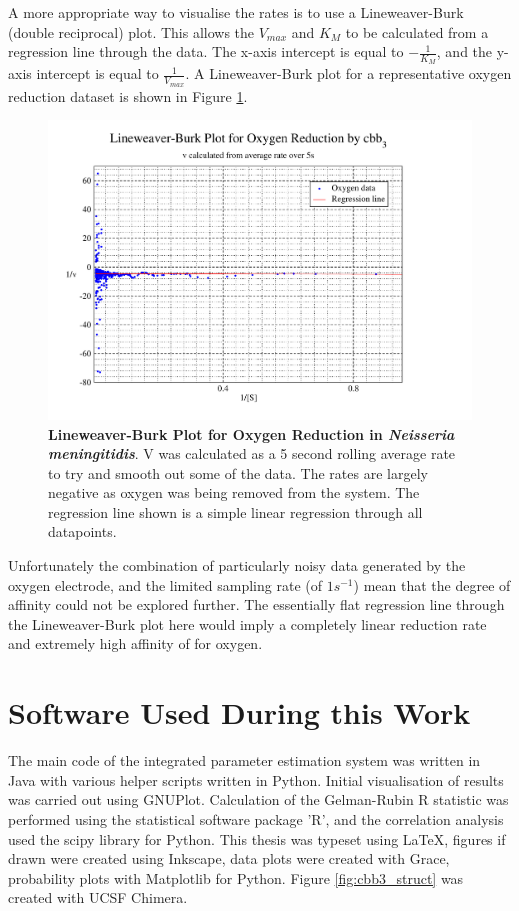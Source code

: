 A more appropriate way to visualise the rates is to use a Lineweaver-Burk (double reciprocal) plot. This allows the $V_{max}$ and $K_M$ to be calculated from a regression line through the data. The x-axis intercept is equal to $-\frac{1}{K_M}$, and the y-axis intercept is equal to $\frac{1}{V_{max}}$. A Lineweaver-Burk plot for a representative oxygen reduction dataset is shown in Figure \ref{fig:o2lb}.
\begin{figure}[ht]
 \centering
 \includegraphics[width=14cm, trim=1cm 1cm 4cm 0.5cm, clip=true]{./appendix/data/lbplot.pdf}
 \caption[{Lineweaver-Burk Plot for Oxygen Reduction in \textit{Neisseria meningitidis}.}]{{\bf Lineweaver-Burk Plot for Oxygen Reduction in \textit{Neisseria meningitidis}}. V was calculated as a 5 second rolling average rate to try and smooth out some of the data. The rates are largely negative as oxygen was being removed from the system. The regression line shown is a simple linear regression through all datapoints.
 \label{fig:o2lb}}
\end{figure}

Unfortunately the combination of particularly noisy data generated by the oxygen electrode, and the limited sampling rate (of $1 s^{-1}$) mean that the degree of affinity could not be explored further. The essentially flat regression line through the Lineweaver-Burk plot here would imply a completely linear reduction rate and extremely high affinity of \cbbthree{} for oxygen.

\section{Software Used During this Work}
The main code of the integrated parameter estimation system was written in Java\texttrademark{} with various helper scripts written in Python. Initial visualisation of results was carried out using GNUPlot. Calculation of the Gelman-Rubin R statistic was performed using the statistical software package 'R', and the correlation analysis used the scipy library for Python. This thesis was typeset using \LaTeX, figures if drawn were created using Inkscape, data plots were created with Grace, probability plots with Matplotlib\cite{Hunter2007a} for Python. Figure \ref{fig:cbb3_struct} was created with UCSF Chimera\cite{Pettersen2004}.
